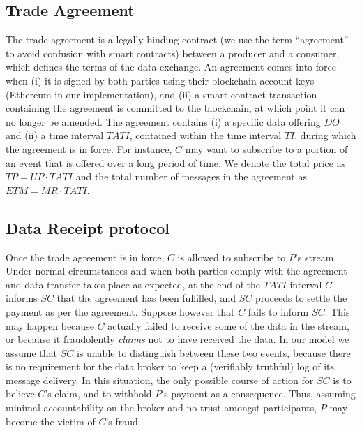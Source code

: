 \documentclass[letterpaper, 10 pt, conference]{ieeeconf}  %
\newcommand{\ti}{\ensuremath{\mathit{TI}}}
\newcommand{\mr}{\ensuremath{\mathit{MR}}}
\newcommand{\up}{\ensuremath{\mathit{UP}}}
\newcommand{\doff}{\ensuremath{\mathit{DO}}}
\newcommand{\tati}{\ensuremath{\mathit{TATI}}}
\newcommand{\etm}{\ensuremath{\mathit{ETM}}}
\newcommand{\tp}{\ensuremath{\mathit{TP}}}
\newcommand{\smartc}{\ensuremath{\mathit{SC}}}
\begin{document}
\subsection{Trade Agreement} \label{sec:agreement}

The trade agreement is a legally binding contract (we use the term ``agreement'' to avoid confusion with smart contracts) between a producer and a consumer, which defines the terms of the data exchange.
An agreement comes into force when (i) it is signed by both parties using their blockchain account keys (Ethereum in our implementation), and (ii) a smart contract transaction containing the agreement is committed to the blockchain, at which point it can no longer be amended.
The agreement contains (i) a specific data offering \doff{} and (ii) a time interval $\tati$, contained within the time interval \ti, during which the agreement is in force.
For instance, $C$ may want to subscribe to a portion of an event that is offered over a long period of time.
We denote the total price as $\tp = \up \cdot \tati$ and the total number of messages in the agreement as $\etm = \mr \cdot \tati$.

%
%
%

\subsection{Data Receipt protocol}  \label{sec:protocol}

Once the trade agreement is in force,  $C$ is allowed to subscribe to $P$'s stream.
Under normal circumstances and when both parties comply with the agreement and data transfer takes place as expected, at the end of the \tati{} interval $C$ informs \smartc{} that the agreement has been fulfilled, and \smartc{} proceeds to settle the payment as per the agreement.
Suppose however that $C$ fails to inform \smartc. This may happen because $C$ actually failed to receive some of the data in the stream, or because it fraudolently \textit{claims} not to have received the data.
In our model we assume that \smartc{} is unable to distinguish between these two events, because there is no requirement for the data broker to keep a (verifiably truthful) log of its message delivery.
In this situation, the only possible course of action for \smartc{} is to believe $C$'s claim, and to withhold $P$'s payment as a consequence.
Thus, assuming minimal accountability on the broker and no trust amongst participants, $P$ may become the victim of $C$'s fraud.
\end{document}
